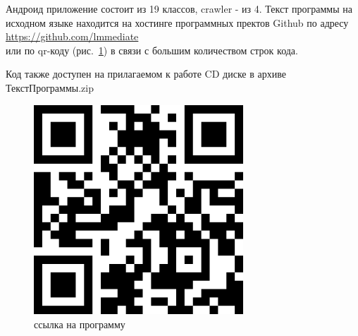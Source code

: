 Андроид приложение состоит из 19 классов, crawler - из 4.
Текст программы на исходном языке находится на хостинге программных пректов Github по
адресу\\
\url{https://github.com/lmmediate}\\
или по qr-коду (рис.~\ref{qr}) в связи с большим количеством строк
кода.

Код также доступен на прилагаемом к работе CD диске в архиве ТекстПрограммы.zip

\begin{figure}[h!]
    \centering
    \includegraphics[width=0.7\textwidth]{./qr.png}
    \caption{ссылка на программу}
    \label{qr}
\end{figure}

